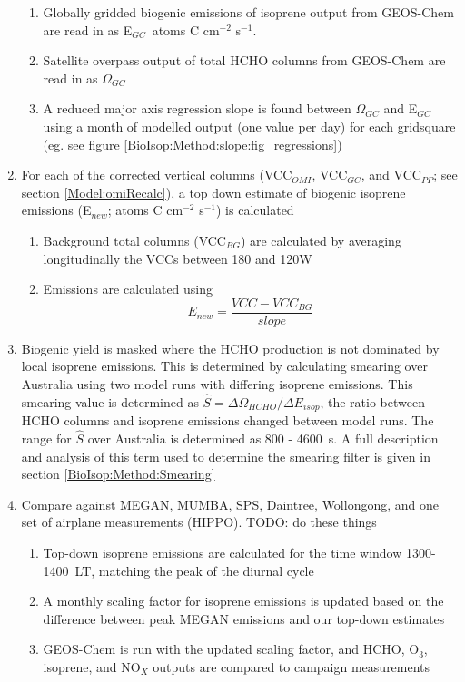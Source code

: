 \begin{enumerate}
      \begin{enumerate}
        \item Globally gridded biogenic emissions of isoprene output from GEOS-Chem are read in as E$_{GC}$~atoms C cm$^{-2}$ s$^{-1}$.
        \item Satellite overpass output of total HCHO columns from GEOS-Chem are read in as $\Omega_{GC}$\moleccm
        \item A reduced major axis regression slope is found between $\Omega_{GC}$ and E$_{GC}$ using a month of modelled output (one value per day) for each gridsquare (eg. see figure \ref{BioIsop:Method:slope:fig_regressions})
      \end{enumerate}
      \item For each of the corrected vertical columns (VCC$_{OMI}$, VCC$_{GC}$, and VCC$_{PP}$; see section \ref{Model:omiRecalc}), a top down estimate of biogenic isoprene emissions (E$_{new}$; atoms C cm$^{-2}$ s$^{-1}$) is calculated
      \begin{enumerate}
        \item 
          Background total columns (VCC$_{BG}$) are calculated by averaging longitudinally the VCCs between 180 and 120\degr W
        \item
          Emissions are calculated using 
          \begin{equation} \label{BioIsop:Method:eqn_Enew}
            E_{new} = \frac{VCC - VCC_{BG}}{slope}
          \end{equation}
      \end{enumerate}
      \item
        Biogenic yield is masked where the HCHO production is not dominated by local isoprene emissions. 
        This is determined by calculating smearing over Australia using two model runs with differing isoprene emissions.
        This smearing value is determined as $\hat{S}=\Delta \Omega_{HCHO}/ \Delta E_{isop}$, the ratio between HCHO columns and isoprene emissions changed between model runs.
        The range for $\hat{S}$ over Australia is determined as 800 - 4600~s.
        A full description and analysis of this term used to determine the smearing filter is given in section \ref{BioIsop:Method:Smearing}
      \item 
        Compare against MEGAN, MUMBA, SPS, Daintree, Wollongong, and one set of airplane measurements (HIPPO).
        TODO: do these things
      \begin{enumerate}
        \item Top-down isoprene emissions are calculated for the time window 1300-1400~LT, matching the peak of the diurnal cycle
        \item A monthly scaling factor for isoprene emissions is updated based on the difference between peak MEGAN emissions and our top-down estimates
        \item GEOS-Chem is run with the updated scaling factor, and HCHO, O$_3$, isoprene, and NO$_X$ outputs are compared to campaign measurements
      \end{enumerate}
    \end{enumerate}
    

